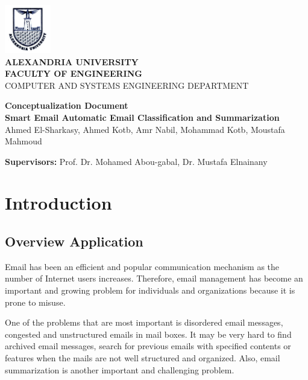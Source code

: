 \documentclass[a4paper,10pt]{article}
\begin{document}
\begin{titlepage}
\vspace{-1.5cm}
\begin{center}
\includegraphics[width=2cm]{Logo_Alexandria_University.jpg}\\
\vspace{1cm}
\textbf{\large ALEXANDRIA UNIVERSITY} \\
\textbf{FACULTY OF ENGINEERING} \\
{\small  COMPUTER AND SYSTEMS ENGINEERING DEPARTMENT}

\vspace{2.5cm}
\textbf{\LARGE Conceptualization Document}\\
\textbf{\small Smart Email Automatic Email Classification and Summarization}\\

\vspace{1cm}
{ Ahmed El-Sharkasy, Ahmed Kotb, Amr Nabil, Mohammad Kotb, Moustafa Mahmoud }
\end{center}

\vspace{1ex}
\textbf{Supervisors:} Prof. Dr. Mohamed Abou-gabal, Dr. Mustafa Elnainany
\end{titlepage}

\newpage
\tableofcontents
\newpage

\section{Introduction}

\subsection{Overview Application}
Email has been an efficient and popular communication mechanism as the number 
of Internet users increases. Therefore, email management has become an important 
and growing problem for individuals and organizations because it is prone to misuse.

One of the problems that are most important is disordered email messages, 
congested and unstructured emails in mail boxes. It may be very hard to 
find archived email messages, search for previous emails with specified contents 
or features when the mails are not well structured and organized. Also, email 
summarization is another important and challenging problem.
\end{document}
